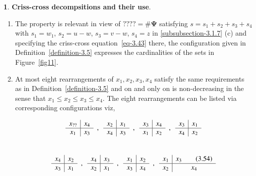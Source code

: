 \documentclass[a4paper,12pt]{article}
\theoremstyle{definition}
\theoremstyle{underlinethm}
\theoremstyle{definition}
\newtheorem{subsubsec}{}[subsection]
\begin{document}
\begin{subsubsec}\label{subsubsection-3.1.8}
\textbf{Criss-cross decompsitions and their use}. 

\begin{enumerate}[label=(\alph*)]
\item The property is relevant in view of $???? = \# \boldsymbol{\Psi}$ satisfying $s=s_{1} + s_{2} + s_{3} + s_{4}$ with $s_{1} = w_{1}$, $s_{2} = u-w$, $s_{3}=v-w$, $s_{4} =z$ in \ref{subsubsection-3.1.7} (c) and specifying the criss-cross equation~\eqref{eq-3.43} there, the configuration given in Definition~\ref{definition-3.5} expresses the cardinalities of the sets in Figure~\ref{fig11}. 

\item At most eight rearrangements of $x_{1}, x_{2}, x_{3}, x_{4}$ satisfy the same requirements as in Definition~\ref{definition-3.5} and on and only on is non-decreasing in the sense that $x_{1} \leq x_{2} \leq x_{3} \leq x_{4}$. The eight rearrangements can be listed via corresponding configurations viz,

\begin{equation}
\begin{array}{c|c}
x_{??} & x_{4}\nonumber\\\hline
x_{1} & x_{3}
\end{array}\\~~,~~
\begin{array}{c|c}
x_{2} & x_{1}\nonumber\\\hline
x_{4} & x_{3}
\end{array}\\~~,~~
\begin{array}{c|c}
x_{3} & x_{4}\nonumber\\\hline
x_{1} & x_{2}
\end{array}\\~~,~~
\begin{array}{c|c}
x_{3} & x_{1}\nonumber\\\hline
x_{4} & x_{2}
\end{array}
\end{equation}\\[-8pt]
\begin{equation}
\begin{array}{c|c}
x_{4} & x_{2}\nonumber\\\hline
x_{3} & x_{1}
\end{array}\\~~,~~
\begin{array}{c|c}
x_{4} & x_{3}\nonumber\\\hline
x_{2} & x_{1}
\end{array}\\~~,~~
\begin{array}{c|c}
x_{1} & x_{2}\nonumber\\\hline
x_{3} & x_{4}
\end{array}\\~~,~~
\begin{array}{c|c}
x_{1} & x_{3}\tag{3.54}\label{eq-3.54}\\\hline
x_{2} & x_{4}
\end{array}
\end{equation}


\end{enumerate}
\end{subsubsec}
\end{document}
